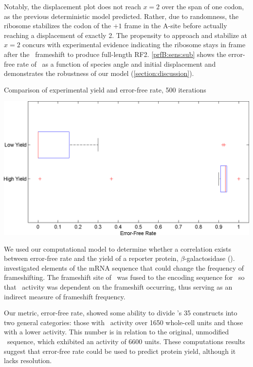 \documentclass[twocolumn, article, oneside]{memoir}
\begin{document}
Notably, the displacement plot does not reach $x=2$ over the span of
one codon, as the previous deterministic model predicted.  Rather, due to randomness, the
ribosome stabilizes the codon of the $+1$ frame in the A-site before actually reaching
a displacement of exactly 2.  The propensity to approach and stabilize at $x=2$
concurs with experimental evidence indicating the ribosome
stays in frame after the \prfB\ frameshift to produce full-length RF2.
\autoref{prfB:sens:sub} shows the error-free rate of \prfB\ as a function
of species angle and initial displacement and demonstrates the
robustness of our model (\autoref{section:discussion}).

\begin{cfigure}
  \caption{Comparison of experimental yield and error-free rate, 500 iterations}
  \label{weissboxplot}
  \includegraphics[width=\linewidth]{histograms/weissbox}
\end{cfigure}

We used our computational model to determine whether a correlation exists between
error-free rate and the yield of a reporter protein, $\beta$-galactosidase (\bgals).
\citet{weiss87} investigated elements of the mRNA sequence that could change the frequency
of frameshifting.  The frameshift site of \prfB\ was fused to the encoding sequence for
\bgals\ so that \bgals\ activity was dependent on the frameshift occurring,
thus serving as an indirect measure of frameshift frequency.

Our metric, error-free rate, showed some ability to divide \citeauthor{weiss87}'s 35 constructs into
two general categories: those with \bgals\ activity over 1650 whole-cell units and those with a
lower activity.  This number is in relation to the original, unmodified \prfB\ sequence,
which exhibited an activity of 6600 units.  These computations results suggest that
error-free rate could be used to predict protein yield, although it lacks resolution.
\end{document}
